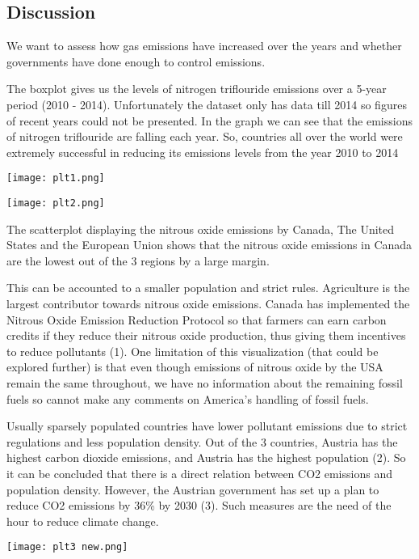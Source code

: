 \documentclass[a4paper, 11pt]{report}
\begin{document}
\subsection{Discussion}

We want to assess how gas emissions have increased over the years and whether governments have done enough to control emissions.\\

\begin{multicols}{2}
     The boxplot gives us the levels of nitrogen triflouride emissions over a 5-year period (2010 - 2014). Unfortunately the dataset only has data till 2014 so figures of recent years could not be presented. In the graph we can see that the emissions of nitrogen triflouride are falling each year. So, countries all over the world were extremely successful in reducing its emissions levels from the year 2010 to 2014

    \texttt{[image: plt1.png]}
    \end{multicols}

    \begin{multicols}{2}
     \texttt{[image: plt2.png]}

    \item The scatterplot displaying the nitrous oxide emissions by Canada, The United States and the European Union shows that the nitrous oxide emissions in Canada are the lowest out of the 3 regions by a large margin.
    \end{multicols}

    This can be accounted to a smaller population and strict rules. Agriculture is the largest contributor towards nitrous oxide emissions. Canada has implemented the Nitrous Oxide Emission Reduction Protocol so that farmers can earn carbon credits if they reduce their nitrous oxide production, thus giving them incentives to reduce pollutants (1). One limitation of this visualization (that could be explored further) is that even though emissions of nitrous oxide by the USA remain the same throughout, we have no information about the remaining fossil fuels so cannot make any comments on America’s handling of fossil fuels. \\


\begin{multicols}{2}
      Usually sparsely populated countries have lower pollutant emissions due to strict regulations and less population density. Out of the 3 countries, Austria has the highest carbon dioxide emissions, and Austria has the highest population (2). So it can be concluded that there is a direct relation between CO2 emissions and population density. However, the Austrian government has set up a plan to reduce CO2 emissions by 36\% by 2030 (3). Such measures are the need of the hour to reduce climate change.

    \texttt{[image: plt3 new.png]}
    \end{multicols}~\\
\end{document}

